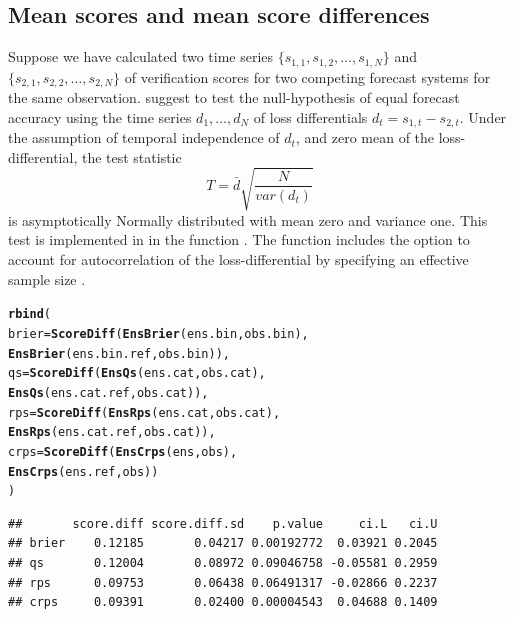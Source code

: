 \documentclass[article]{jss}\usepackage{graphicx, color}
\makeatletter
\newcommand{\hlfunctioncall}[1]{\textcolor[rgb]{0,0.501960784313725,0.752941176470588}{\textbf{#1}}}%
\newenvironment{kframe}{%
 \def\at@end@of@kframe{}%
 \ifinner\ifhmode%
  \def\at@end@of@kframe{\end{minipage}}%
  \begin{minipage}{\columnwidth}%
 \fi\fi%
 \def\FrameCommand##1{\hskip\@totalleftmargin \hskip-\fboxsep
 \colorbox{shadecolor}{##1}\hskip-\fboxsep
     \hskip-\linewidth \hskip-\@totalleftmargin \hskip\columnwidth}%
 \MakeFramed {\advance\hsize-\width
   \@totalleftmargin\z@ \linewidth\hsize
   \@setminipage}}%
 {\par\unskip\endMakeFramed%
 \at@end@of@kframe}
\newenvironment{knitrout}{}{} %
\makeatother
\begin{document}
\subsection{Mean scores and mean score differences}

Suppose we have calculated two time series $\{s_{1,1}, s_{1,2}, \dots, s_{1,N}\}$ and $\{s_{2,1}, s_{2,2}, \dots, s_{2,N}\}$ of verification scores for two competing forecast systems for the same observation.
\citet{diebold1995comparing} suggest to test the null-hypothesis of equal forecast accuracy using the time series $d_1, \dots, d_N$ of loss differentials $d_t = s_{1,t} - s_{2,t}$. 
Under the assumption of temporal independence of $d_t$, and zero mean of the loss-differential, the test statistic 
%
\begin{equation}
T = \bar{d}\sqrt{\frac{N}{var(d_t)}}
\end{equation}
%
is asymptotically Normally distributed with mean zero and variance one.
This test is implemented in  in the function .
The function includes the option to account for autocorrelation of the loss-differential by specifying an effective sample size .

\begin{knitrout}
\color{fgcolor}\begin{kframe}
\begin{alltt}
\hlfunctioncall{rbind}(
  brier = \hlfunctioncall{ScoreDiff}(\hlfunctioncall{EnsBrier}(ens.bin, obs.bin), 
                    \hlfunctioncall{EnsBrier}(ens.bin.ref, obs.bin)),
  qs    = \hlfunctioncall{ScoreDiff}(\hlfunctioncall{EnsQs}(ens.cat, obs.cat),    
                    \hlfunctioncall{EnsQs}(ens.cat.ref, obs.cat)),
  rps   = \hlfunctioncall{ScoreDiff}(\hlfunctioncall{EnsRps}(ens.cat, obs.cat),   
                    \hlfunctioncall{EnsRps}(ens.cat.ref, obs.cat)),
  crps  = \hlfunctioncall{ScoreDiff}(\hlfunctioncall{EnsCrps}(ens, obs),          
                    \hlfunctioncall{EnsCrps}(ens.ref, obs))
)
\end{alltt}
\begin{verbatim}
##       score.diff score.diff.sd    p.value     ci.L   ci.U
## brier    0.12185       0.04217 0.00192772  0.03921 0.2045
## qs       0.12004       0.08972 0.09046758 -0.05581 0.2959
## rps      0.09753       0.06438 0.06491317 -0.02866 0.2237
## crps     0.09391       0.02400 0.00004543  0.04688 0.1409
\end{verbatim}
\end{kframe}
\end{knitrout}
\end{document}
